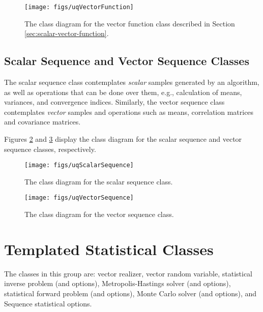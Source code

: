 \begin{figure}[htpb]
\hspace{-40pt}
\texttt{[image: figs/uqVectorFunction]}
\vspace{-18pt}
\caption{The class diagram for the vector function class described in Section \ref{sec:scalar-vector-function}.} %
\label{fig-vector-function-class}
\end{figure}


\subsection{Scalar Sequence and Vector Sequence Classes}\label{sec:scalar-vector-sequence}
%
The scalar sequence class contemplates {\it scalar} samples generated by an algorithm, as well as operations that can
be done over them, e.g., calculation of means, variances, and convergence indices.
Similarly, the vector sequence class contemplates {\it vector} samples and operations such as means, correlation matrices and covariance matrices.

Figures \ref{fig-scalar-sequence-class} and \ref{fig-vector-sequence-class} display the class diagram for the scalar sequence  and vector sequence classes, respectively.

\begin{figure}[htpb]
\centering
\texttt{[image: figs/uqScalarSequence]}
\vspace{-8pt}
\caption{The class diagram for the scalar sequence class.}
\label{fig-scalar-sequence-class}
\end{figure}

\begin{figure}[htpb]
\centering
\texttt{[image: figs/uqVectorSequence]}
\vspace{-8pt}
\caption{The class diagram for the vector sequence class.}
\label{fig-vector-sequence-class}
\end{figure}



\section{Templated Statistical Classes}

The classes in this group are: vector realizer, vector random variable, statistical inverse problem (and options), Metropolis-Hastings solver (and options), statistical forward problem (and options), Monte Carlo solver (and options), and Sequence statistical options.

